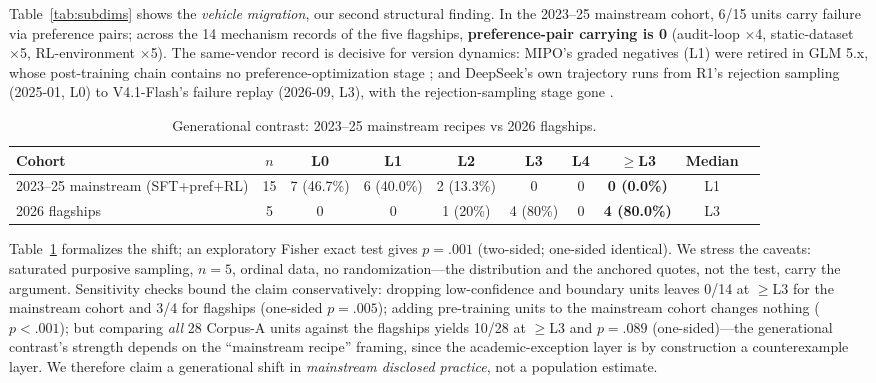 \documentclass[10pt]{article}
\begin{document}
Table~\ref{tab:subdims} shows the \emph{vehicle migration}, our second structural finding. In the 2023--25 mainstream cohort, 6/15 units carry failure via preference pairs; across the 14 mechanism records of the five flagships, \textbf{preference-pair carrying is 0} (audit-loop $\times$4, static-dataset $\times$5, RL-environment $\times$5). The same-vendor record is decisive for version dynamics: MIPO's graded negatives (L1) were retired in GLM 5.x, whose post-training chain contains no preference-optimization stage \cite{zai2025glm45,zai2026glm5}; and DeepSeek's own trajectory runs from R1's rejection sampling (2025-01, L0) to V4.1-Flash's failure replay (2026-09, L3), with the rejection-sampling stage gone \cite{deepseek2025r1,deepseek2026v41}.

\begin{table}[t]
\centering
\caption{Generational contrast: 2023--25 mainstream recipes vs 2026 flagships.}
\label{tab:generations}
\small
\begin{tabular}{lccccccccc}
\toprule
Cohort & $n$ & L0 & L1 & L2 & L3 & L4 & $\ge$L3 & Median \\
\midrule
2023--25 mainstream (SFT+pref+RL) & 15 & 7 (46.7\%) & 6 (40.0\%) & 2 (13.3\%) & 0 & 0 & \textbf{0 (0.0\%)} & L1 \\
2026 flagships & 5 & 0 & 0 & 1 (20\%) & 4 (80\%) & 0 & \textbf{4 (80.0\%)} & L3 \\
\bottomrule
\end{tabular}
\end{table}

Table~\ref{tab:generations} formalizes the shift; an exploratory Fisher exact test gives $p = .001$ (two-sided; one-sided identical). We stress the caveats: saturated purposive sampling, $n = 5$, ordinal data, no randomization---the distribution and the anchored quotes, not the test, carry the argument. Sensitivity checks bound the claim conservatively: dropping low-confidence and boundary units leaves 0/14 at $\ge$L3 for the mainstream cohort and 3/4 for flagships (one-sided $p = .005$); adding pre-training units to the mainstream cohort changes nothing ($p < .001$); but comparing \emph{all} 28 Corpus-A units against the flagships yields 10/28 at $\ge$L3 and $p = .089$ (one-sided)---the generational contrast's strength depends on the ``mainstream recipe'' framing, since the academic-exception layer is by construction a counterexample layer. We therefore claim a generational shift in \emph{mainstream disclosed practice}, not a population estimate.
\end{document}
